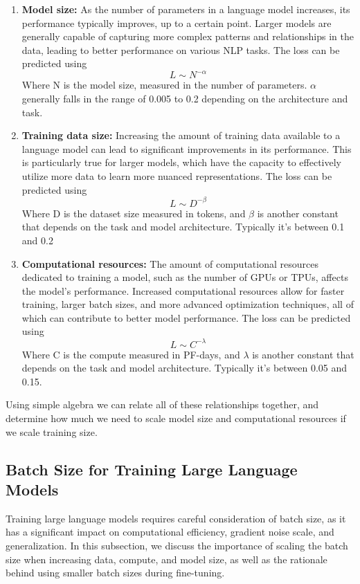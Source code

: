 \documentclass[12pt]{article}
\begin{document}
\begin{enumerate}
\item {\textbf{Model size:} As the number of parameters in a language model increases, its performance typically improves, up to a certain point. Larger models are generally capable of capturing more complex patterns and relationships in the data, leading to better performance on various NLP tasks. The loss can be predicted using
	$$L \sim N^{-\alpha} $$ 
	Where N is the model size, measured in the number of parameters. $\alpha$ generally falls in the range of 0.005 to 0.2 depending on the architecture and task. 
}

\item \textbf{Training data size:} Increasing the amount of training data available to a language model can lead to significant improvements in its performance. This is particularly true for larger models, which have the capacity to effectively utilize more data to learn more nuanced representations. The loss can be predicted using $$L \sim D^{-\beta} $$ Where D is the dataset size measured in tokens, and $\beta$ is another constant that depends on the task and model architecture. Typically it's between 0.1 and 0.2

\item \textbf{Computational resources:} The amount of computational resources dedicated to training a model, such as the number of GPUs or TPUs, affects the model's performance. Increased computational resources allow for faster training, larger batch sizes, and more advanced optimization techniques, all of which can contribute to better model performance. The loss can be predicted using $$L \sim C^{-\lambda} $$ Where C is the compute measured in PF-days, and $\lambda$ is another constant that depends on the task and model architecture. Typically it's between 0.05 and 0.15.
\end{enumerate}
Using simple algebra we can relate all of these relationships together, and determine how much we need to scale model size and computational resources if we scale training size.

\subsection{Batch Size for Training Large Language Models}

Training large language models requires careful consideration of batch size, as it has a significant impact on computational efficiency, gradient noise scale, and generalization. In this subsection, we discuss the importance of scaling the batch size when increasing data, compute, and model size, as well as the rationale behind using smaller batch sizes during fine-tuning.
\end{document}
